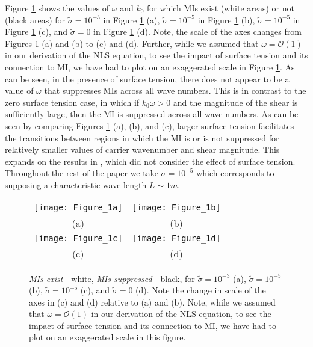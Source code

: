 \documentclass{JFM_Style/jfm}
\begin{document}
Figure \ref{fig:miplot} shows the values of $\omega$ and $k_{0}$ for which MIs exist (white areas) or not (black areas) for $\tilde{\sigma}=10^{-3}$ in Figure \ref{fig:miplot} (a), $\tilde{\sigma}=10^{-5}$ in Figure \ref{fig:miplot} (b), $\tilde{\sigma}=10^{-5}$ in Figure \ref{fig:miplot} (c), and $\tilde{\sigma}=0$ in Figure \ref{fig:miplot} (d).   Note, the scale of the axes changes from Figures \ref{fig:miplot} (a) and (b) to (c) and (d).  Further, while we assumed that $\omega = \mathcal{O}(1)$ in our derivation of the NLS equation, to see the impact of surface tension and its connection to MI, we have had to plot on an exaggerated scale in Figure \ref{fig:miplot}.  As can be seen, in the presence of surface tension, there does not appear to be a value of $\omega$ that suppresses MIs across all wave numbers.  This is in contrast to the zero surface tension case, in which if $k_{0}\omega>0$ and the magnitude of the shear is sufficiently large, then the MI is suppressed across all wave numbers.  As can be seen by comparing Figures \ref{fig:miplot} (a), (b), and (c), larger surface tension facilitates the transitions between regions in which the MI is or is not suppressed for relatively smaller values of carrier wavenumber and shear magnitude.  This expands on the results in \cite{thomas2012nonlinear}, which did not consider the effect of surface tension.  Throughout the rest of the paper we take $\tilde{\sigma}=10^{-5}$ which corresponds to supposing a characteristic wave length $L\sim 1m$.
\begin{figure}
\centering
\begin{tabular}{cc}
\texttt{[image: Figure\_1a]} & \texttt{[image: Figure\_1b]}\\
(a) & (b)\\
\texttt{[image: Figure\_1c]} & \texttt{[image: Figure\_1d]}\\
(c) & (d)
\end{tabular}
\caption{\small {\it MIs exist} - white, \small{\it MIs suppressed} - black, for $\tilde{\sigma}=10^{-3}$ (a), $\tilde{\sigma}=10^{-5}$ (b), $\tilde{\sigma}=10^{-5}$ (c), and $\tilde{\sigma}=0$ (d).  Note the change in scale of the axes in (c) and (d) relative to (a) and (b).  Note, while we assumed that $\omega = \mathcal{O}(1)$ in our derivation of the NLS equation, to see the impact of surface tension and its connection to MI, we have had to plot on an exaggerated scale in this figure.}
\label{fig:miplot}
\end{figure}
\end{document}
